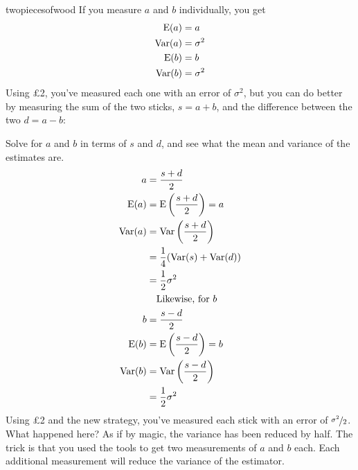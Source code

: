 \begin{answer}{twopiecesofwood}
If you measure $a$ and $b$ individually, you get
\begin{align*}
\operatorname{\mathrm{E}}(a)   &= a \\
\operatorname{\mathrm{Var}}(a) &= \sigma^2 \\
\operatorname{\mathrm{E}}(b)   &= b \\
\operatorname{\mathrm{Var}}(b) &= \sigma^2
\end{align*}
Using \pounds 2, you've measured each one with an error of $\sigma^2$, but you can do better
by measuring the sum of the two sticks, $s = a+b$, and the difference between the two $d = a-b$:
\begin{center}


\end{center}
Solve for $a$ and $b$ in terms of $s$ and $d$, and see what the mean and variance of the estimates are.
\begin{align*}
a   &= \frac{s + d}{2} \\
\operatorname{\mathrm{E}}(a)  &= \operatorname{\mathrm{E}}\left(\frac{s + d}{2}\right)
        =  a \\
\operatorname{\mathrm{Var}}(a) &= \operatorname{\mathrm{Var}}\left(\frac{s + d}{2} \right) \\
        &= \frac{1}{4}(\operatorname{\mathrm{Var}}(s) + \operatorname{\mathrm{Var}}(d)) \\
        &= \frac{1}{2}\sigma^2 \\
        & \quad \text{Likewise, for } b \\
b   &= \frac{s - d}{2} \\
\operatorname{\mathrm{E}}(b)  &= \operatorname{\mathrm{E}}\left(\frac{s - d}{2}\right)
        =  b \\
\operatorname{\mathrm{Var}}(b) &= \operatorname{\mathrm{Var}}\left(\frac{s - d}{2} \right) \\
        &= \frac{1}{2}\sigma^2
\end{align*}
Using \pounds 2 and the new strategy, you've measured each stick with an error of $\nicefrac{\sigma^2}{2}$.
What happened here? As if by magic, the variance has been reduced by half.
The trick is that you used the tools to get two measurements of $a$ and $b$ each.
Each additional measurement will reduce the variance of the estimator.
\end{answer}
